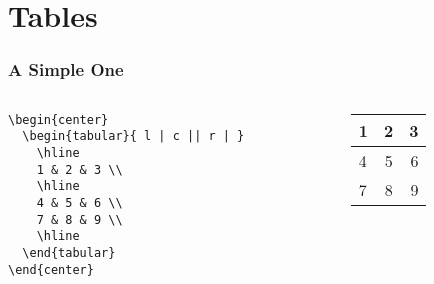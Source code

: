 \section{Tables}
\begin{frame}[fragile]
\frametitle{A Simple One}

  \begin{columns}
    \begin{column}{.5\textwidth}
      \begin{scriptsize}
\begin{verbatim}
\begin{center}
  \begin{tabular}{ l | c || r | }
    \hline
    1 & 2 & 3 \\
    \hline
    4 & 5 & 6 \\
    7 & 8 & 9 \\
    \hline
  \end{tabular}
\end{center}
\end{verbatim}
      \end{scriptsize}
    \end{column}

    \begin{column}{.4\textwidth}
      \begin{center}
        \begin{tabular}{ l | c || r | }
          \hline
          1 & 2 & 3 \\
          \hline
          4 & 5 & 6 \\
          7 & 8 & 9 \\
         \hline
        \end{tabular}
      \end{center}
    \end{column}
  \end{columns}

\end{frame}
